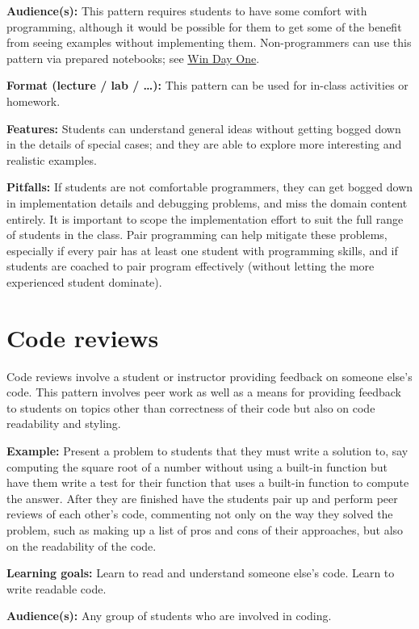 \documentclass[]{book}
\begin{document}
\textbf{Audience(s):} This pattern requires students to have some
comfort with programming, although it would be possible for them to get
some of the benefit from seeing examples without implementing them.
Non-programmers can use this pattern via prepared notebooks; see
\protect\hyperlink{win-day-one}{Win Day One}.

\textbf{Format (lecture / lab / \ldots{}):} This pattern can be used for
in-class activities or homework.

\textbf{Features:} Students can understand general ideas without getting
bogged down in the details of special cases; and they are able to
explore more interesting and realistic examples.

\textbf{Pitfalls:} If students are not comfortable programmers, they can
get bogged down in implementation details and debugging problems, and
miss the domain content entirely. It is important to scope the
implementation effort to suit the full range of students in the class.
Pair programming can help mitigate these problems, especially if every
pair has at least one student with programming skills, and if students
are coached to pair program effectively (without letting the more
experienced student dominate).

\section{Code reviews}\label{code-reviews}

Code reviews involve a student or instructor providing feedback on
someone else's code. This pattern involves peer work as well as a means
for providing feedback to students on topics other than correctness of
their code but also on code readability and styling.

\textbf{Example:} Present a problem to students that they must write a
solution to, say computing the square root of a number without using a
built-in function but have them write a test for their function that
uses a built-in function to compute the answer. After they are finished
have the students pair up and perform peer reviews of each other's code,
commenting not only on the way they solved the problem, such as making
up a list of pros and cons of their approaches, but also on the
readability of the code.

\textbf{Learning goals:} Learn to read and understand someone else's
code. Learn to write readable code.

\textbf{Audience(s):} Any group of students who are involved in coding.
\end{document}
